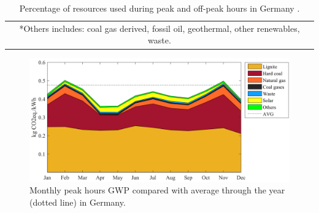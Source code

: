 {{ \begin{table}[htbp]
\centering
\caption{Percentage of resources used during peak and off-peak hours in Germany \cite{Entso-eProduction}.}
\label{RES_DE}
\begin{tabular}{@{}c@{}} 
\multicolumn{1}{p{\textwidth}}{\footnotesize {*Others} includes: coal gas derived,  fossil oil, geothermal, other renewables, waste.}
\end{tabular}
\end{table}


\begin{figure}[htbp]
	\centering
	\includegraphics[width=1\textwidth]{ChapterLCA/Images/GWP_plots/Germany_GWP.png}
	\caption{Monthly peak hours GWP compared with average through the year (dotted line) in Germany.}
	\label{GWP_DE}
\end{figure}
	
}}
